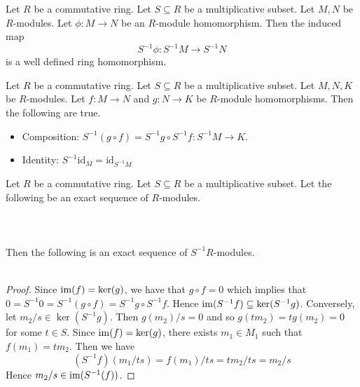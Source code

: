 \documentclass[a4paper]{article}
\begin{document}
\begin{lmm}{}{} Let $R$ be a commutative ring. Let $S\subseteq R$ be a multiplicative subset. Let $M,N$ be $R$-modules. Let $\phi:M\to N$ be an $R$-module homomorphism. Then the induced map $$S^{-1}\phi:S^{-1}M\to S^{-1}N$$ is a well defined ring homomorphism. 
\end{lmm}

\begin{lmm}{}{} Let $R$ be a commutative ring. Let $S\subseteq R$ be a multiplicative subset. Let $M,N,K$ be $R$-modules. Let $f:M\to N$ and $g:N\to K$ be $R$-module homomorphisms. Then the following are true. 
\begin{itemize}
\item Composition: $S^{-1}(g\circ f)=S^{-1}g\circ S^{-1}f:S^{-1}M\to K$. 
\item Identity: $S^{-1}\text{id}_M=\text{id}_{S^{-1}M}$
\end{itemize}
\end{lmm}

\begin{prp}{}{} Let $R$ be a commutative ring. Let $S\subseteq R$ be a multiplicative subset. Let the following be an exact sequence of $R$-modules. \\~\\
\\~\\
Then the following is an exact sequence of $S^{-1}R$-modules. \\~\\
 \tcbline
\begin{proof}
Since $\operatorname{im}(f)=\ker(g)$, we have that $g\circ f=0$ which implies that $0=S^{-1}0=S^{-1}(g\circ f)=S^{-1}g\circ S^{-1}f$. Hence $\operatorname{im}(S^{-1}f)\subseteq\ker(S^{-1}g)$. Conversely, let $m_2/s\in\ker(S^{-1}g)$. Then $g(m_2)/s=0$ and so $g(tm_2)=tg(m_2)=0$ for some $t\in S$. Since $\operatorname{im}(f)=\ker(g)$, there exists $m_1\in M_1$ such that $f(m_1)=tm_2$. Then we have $$(S^{-1}f)(m_1/ts)=f(m_1)/ts=tm_2/ts=m_2/s$$ Hence $m_2/s\in\operatorname{im}(S^{-1}(f))$. 
\end{proof}
\end{prp}
\end{document}
